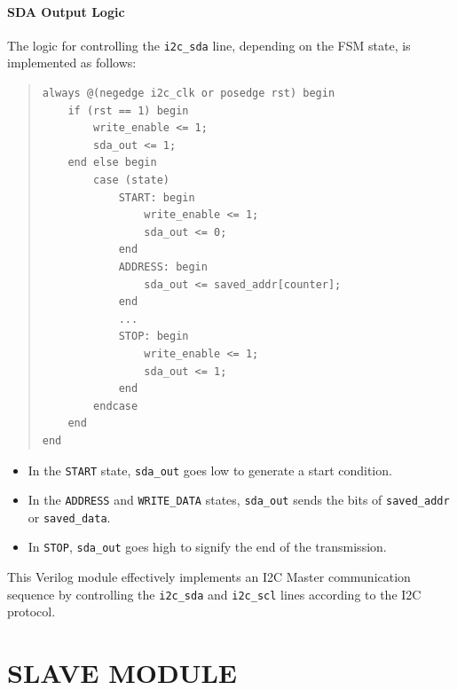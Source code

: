 \documentclass[a4paper,12pt]{report}
\begin{document}
\paragraph{SDA Output Logic}
The logic for controlling the \texttt{i2c\_sda} line, depending on the FSM state, is implemented as follows:

\begin{quote}
\begin{verbatim}
always @(negedge i2c_clk or posedge rst) begin
    if (rst == 1) begin
        write_enable <= 1;
        sda_out <= 1;
    end else begin
        case (state)
            START: begin
                write_enable <= 1;
                sda_out <= 0;
            end
            ADDRESS: begin
                sda_out <= saved_addr[counter];
            end
            ...
            STOP: begin
                write_enable <= 1;
                sda_out <= 1;
            end
        endcase
    end
end
\end{verbatim}
\end{quote}

\begin{itemize}
    \item In the \texttt{START} state, \texttt{sda\_out} goes low to generate a start condition.
    \item In the \texttt{ADDRESS} and \texttt{WRITE\_DATA} states, \texttt{sda\_out} sends the bits of \texttt{saved\_addr} or \texttt{saved\_data}.
    \item In \texttt{STOP}, \texttt{sda\_out} goes high to signify the end of the transmission.
\end{itemize}

This Verilog module effectively implements an I2C Master communication sequence by controlling the \texttt{i2c\_sda} and \texttt{i2c\_scl} lines according to the I2C protocol.


\section{SLAVE MODULE}
\end{document}
